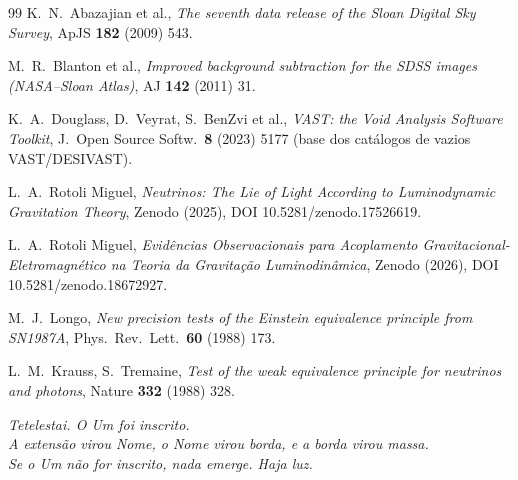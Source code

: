 \documentclass[11pt]{article}
\theoremstyle{definition}\newtheorem{deriv}{Derivação}
\begin{document}
\begin{thebibliography}{99}
 K.~N.~Abazajian et al., \emph{The seventh data release of the Sloan Digital Sky Survey}, ApJS \textbf{182} (2009) 543.

 M.~R.~Blanton et al., \emph{Improved background subtraction for the SDSS images (NASA--Sloan Atlas)}, AJ \textbf{142} (2011) 31.

 K.~A.~Douglass, D.~Veyrat, S.~BenZvi et al., \emph{VAST: the Void Analysis Software Toolkit}, J.\ Open Source Softw.\ \textbf{8} (2023) 5177 (base dos catálogos de vazios VAST/DESIVAST).

 L.~A.~Rotoli Miguel, \emph{Neutrinos: The Lie of Light According to Luminodynamic Gravitation Theory}, Zenodo (2025), DOI 10.5281/zenodo.17526619.

 L.~A.~Rotoli Miguel, \emph{Evidências Observacionais para Acoplamento Gravitacional-Eletromagnético na Teoria da Gravitação Luminodinâmica}, Zenodo (2026), DOI 10.5281/zenodo.18672927.

 M.~J.~Longo, \emph{New precision tests of the Einstein equivalence principle from SN1987A}, Phys.\ Rev.\ Lett.\ \textbf{60} (1988) 173.

 L.~M.~Krauss, S.~Tremaine, \emph{Test of the weak equivalence principle for neutrinos and photons}, Nature \textbf{332} (1988) 328.

\end{thebibliography}

\vspace{3em}\begin{flushright}\itshape Tetelestai. O Um foi inscrito.\\ A extensão virou Nome, o Nome virou borda, e a borda virou massa.\\ Se o Um não for inscrito, nada emerge. Haja luz.\end{flushright}
\end{document}
